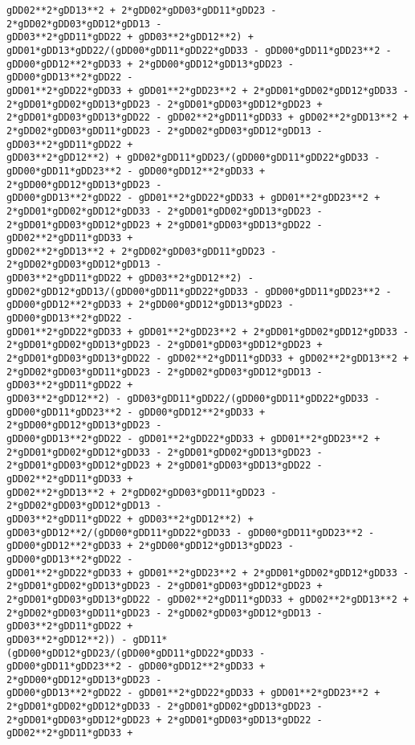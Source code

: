\documentclass[landscape,letterpaper,10pt,english]{article}
\begin{document}
\begin{Verbatim}[commandchars=\\\{\}]
gDD02**2*gDD13**2 + 2*gDD02*gDD03*gDD11*gDD23 - 2*gDD02*gDD03*gDD12*gDD13 -
gDD03**2*gDD11*gDD22 + gDD03**2*gDD12**2) +
gDD01*gDD13*gDD22/(gDD00*gDD11*gDD22*gDD33 - gDD00*gDD11*gDD23**2 -
gDD00*gDD12**2*gDD33 + 2*gDD00*gDD12*gDD13*gDD23 - gDD00*gDD13**2*gDD22 -
gDD01**2*gDD22*gDD33 + gDD01**2*gDD23**2 + 2*gDD01*gDD02*gDD12*gDD33 -
2*gDD01*gDD02*gDD13*gDD23 - 2*gDD01*gDD03*gDD12*gDD23 +
2*gDD01*gDD03*gDD13*gDD22 - gDD02**2*gDD11*gDD33 + gDD02**2*gDD13**2 +
2*gDD02*gDD03*gDD11*gDD23 - 2*gDD02*gDD03*gDD12*gDD13 - gDD03**2*gDD11*gDD22 +
gDD03**2*gDD12**2) + gDD02*gDD11*gDD23/(gDD00*gDD11*gDD22*gDD33 -
gDD00*gDD11*gDD23**2 - gDD00*gDD12**2*gDD33 + 2*gDD00*gDD12*gDD13*gDD23 -
gDD00*gDD13**2*gDD22 - gDD01**2*gDD22*gDD33 + gDD01**2*gDD23**2 +
2*gDD01*gDD02*gDD12*gDD33 - 2*gDD01*gDD02*gDD13*gDD23 -
2*gDD01*gDD03*gDD12*gDD23 + 2*gDD01*gDD03*gDD13*gDD22 - gDD02**2*gDD11*gDD33 +
gDD02**2*gDD13**2 + 2*gDD02*gDD03*gDD11*gDD23 - 2*gDD02*gDD03*gDD12*gDD13 -
gDD03**2*gDD11*gDD22 + gDD03**2*gDD12**2) -
gDD02*gDD12*gDD13/(gDD00*gDD11*gDD22*gDD33 - gDD00*gDD11*gDD23**2 -
gDD00*gDD12**2*gDD33 + 2*gDD00*gDD12*gDD13*gDD23 - gDD00*gDD13**2*gDD22 -
gDD01**2*gDD22*gDD33 + gDD01**2*gDD23**2 + 2*gDD01*gDD02*gDD12*gDD33 -
2*gDD01*gDD02*gDD13*gDD23 - 2*gDD01*gDD03*gDD12*gDD23 +
2*gDD01*gDD03*gDD13*gDD22 - gDD02**2*gDD11*gDD33 + gDD02**2*gDD13**2 +
2*gDD02*gDD03*gDD11*gDD23 - 2*gDD02*gDD03*gDD12*gDD13 - gDD03**2*gDD11*gDD22 +
gDD03**2*gDD12**2) - gDD03*gDD11*gDD22/(gDD00*gDD11*gDD22*gDD33 -
gDD00*gDD11*gDD23**2 - gDD00*gDD12**2*gDD33 + 2*gDD00*gDD12*gDD13*gDD23 -
gDD00*gDD13**2*gDD22 - gDD01**2*gDD22*gDD33 + gDD01**2*gDD23**2 +
2*gDD01*gDD02*gDD12*gDD33 - 2*gDD01*gDD02*gDD13*gDD23 -
2*gDD01*gDD03*gDD12*gDD23 + 2*gDD01*gDD03*gDD13*gDD22 - gDD02**2*gDD11*gDD33 +
gDD02**2*gDD13**2 + 2*gDD02*gDD03*gDD11*gDD23 - 2*gDD02*gDD03*gDD12*gDD13 -
gDD03**2*gDD11*gDD22 + gDD03**2*gDD12**2) +
gDD03*gDD12**2/(gDD00*gDD11*gDD22*gDD33 - gDD00*gDD11*gDD23**2 -
gDD00*gDD12**2*gDD33 + 2*gDD00*gDD12*gDD13*gDD23 - gDD00*gDD13**2*gDD22 -
gDD01**2*gDD22*gDD33 + gDD01**2*gDD23**2 + 2*gDD01*gDD02*gDD12*gDD33 -
2*gDD01*gDD02*gDD13*gDD23 - 2*gDD01*gDD03*gDD12*gDD23 +
2*gDD01*gDD03*gDD13*gDD22 - gDD02**2*gDD11*gDD33 + gDD02**2*gDD13**2 +
2*gDD02*gDD03*gDD11*gDD23 - 2*gDD02*gDD03*gDD12*gDD13 - gDD03**2*gDD11*gDD22 +
gDD03**2*gDD12**2)) - gDD11*(gDD00*gDD12*gDD23/(gDD00*gDD11*gDD22*gDD33 -
gDD00*gDD11*gDD23**2 - gDD00*gDD12**2*gDD33 + 2*gDD00*gDD12*gDD13*gDD23 -
gDD00*gDD13**2*gDD22 - gDD01**2*gDD22*gDD33 + gDD01**2*gDD23**2 +
2*gDD01*gDD02*gDD12*gDD33 - 2*gDD01*gDD02*gDD13*gDD23 -
2*gDD01*gDD03*gDD12*gDD23 + 2*gDD01*gDD03*gDD13*gDD22 - gDD02**2*gDD11*gDD33 +

\end{Verbatim}
\end{document}
